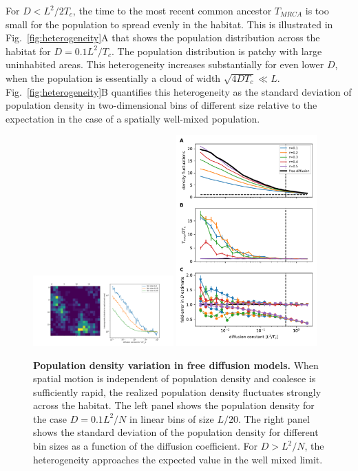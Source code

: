 \documentclass[aps,rmp, twocolumn]{revtex4}
\begin{document}
For $D<L^2/2T_c$, the time to the most recent common ancestor $T_{MRCA}$ is too small for the population to spread evenly in the habitat.
This is illustrated in Fig.~\ref{fig:heterogeneity}A that shows the population distribution across the habitat for $D=0.1L^2/T_c$.
The population distribution is patchy with large uninhabited areas.
This heterogeneity increases substantially for even lower $D$, when the population is essentially a cloud of width $\sqrt{4DT_c}\ll L$.
Fig.~\ref{fig:heterogeneity}B quantifies this heterogeneity as the standard deviation of population density in two-dimensional bins of different size  relative to the expectation in the case of a spatially well-mixed population.


\begin{figure}
    \includegraphics[width=0.48\textwidth]{figures/heterogeneity_free_diffusion}
    \includegraphics[width=0.48\textwidth]{figures/stable_density}
    \caption{\label{fig:density_reg}  {\bf Population density variation in free diffusion models.}
    When spatial motion is independent of population density and coalesce is sufficiently rapid, the realized population density fluctuates strongly across the habitat. The left panel shows the population density for the case $D = 0.1 L^2/N$ in linear bins of size $L/20$. The right panel shows the standard deviation of the population density for different bin sizes as a function of the diffusion coefficient. For $D>L^2/N$, the heterogeneity approaches the expected value in the well mixed limit.
}
\end{figure}
\end{document}

